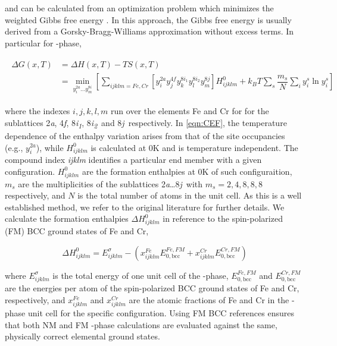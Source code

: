 \documentclass[superscriptaddress, 12pt]{revtex4-2}%
\newcommand{\ijklm}{ijklm}
\newcommand{\siteA}{2\textit{a}}
\newcommand{\siteB}{4\textit{f}}
\newcommand{\siteC}{8\textit{i\textsubscript{1}}}
\newcommand{\siteD}{8\textit{i\textsubscript{2}}}
\newcommand{\siteE}{8\textit{j}}
\begin{document}
\noindent and can be calculated from an optimization problem which minimizes the weighted Gibbs free energy \cite{zhang_prediction_2025}. 
In this approach, the Gibbs free energy is usually derived from a Gorsky-Bragg-Williams approximation without excess terms\cite{gorsky_rontgenographische_1928,bragg_effect_1997,chizhikov_gorsky-bragg-williams_2000}.
In particular for \textsigma-phase,

\begin{align}\label{eqn:CEF}
  \begin{split}
    \Delta G(x, T) &= \Delta H(x, T) - T S(x, T) \\
		   &= \min _{ y_i ^{2a}  \dots y_m ^{8i} } 
		   \left[  
		     \sum_{i j k l m = Fe, Cr} {}
		   \left[  
                    y_i^{2a} y_j^{4f} y_k^{8i_1} y_l ^{8i_2} y_m ^{8j}
                   \right] H_{i j k l m} ^0 
		   + k_B T \sum_s \dfrac{m_s}{N} \sum_i y_i ^s \ln y_i ^s
	           \right]
  \end{split}
\end{align}

\noindent where the indexes $i, j, k, l, m$ run over the elements Fe and Cr for for the sublattices \siteA, \siteB,  \siteC, \siteD~and \siteE~respectively.
In \autoref{eqn:CEF}, the temperature dependence of the enthalpy variation arises from that of the site occupancies (e.g., $y_i ^{2a}$), while $H^0_{ijklm}$ is calculated at 0K and is temperature independent.
The compound index \textit{\ijklm} identifies a particular end member with a given configuration. 
$H_{i j k l m} ^0$ are the formation enthalpies at 0K of such configuraition, $m_s$ are the multiplicities of the sublattices \siteA \ldots \siteE~with $m_s = 2, 4, 8, 8, 8$ respectively, and $N$ is the total number of atoms in the unit cell.
As this is a well established method, we refer to the original literature for further details.
We calculate the formation enthalpies $\Delta H_{ijklm}^0$ in reference to the spin-polarized (FM) BCC ground states of Fe and Cr, 

\begin{equation}\label{eqn:formation_enthalpy}
  \Delta H_{\ijklm}^0 = E_{\ijklm}^{\sigma} - \left( x_{\ijklm}^{Fe} E^{Fe,FM}_{0,\text{bcc}} + x_{\ijklm}^{Cr} E^{Cr,FM}_{0,\text{bcc}} \right)
\end{equation}

\noindent where $E_{\ijklm}^{\sigma}$ is the total energy of one unit cell of the \textsigma-phase, $E_{0,\text{bcc}}^{Fe,FM}$ and $E_{0,\text{bcc}}^{Cr,FM}$ are the energies per atom of the spin-polarized BCC ground states of Fe and Cr, respectively, and $x_{\ijklm}^{Fe}$ and $x_{ijklm}^{Cr}$ are the atomic fractions of Fe and Cr in the \textsigma-phase unit cell for the specific configuration.
Using FM BCC references ensures that both NM and FM \textsigma-phase calculations are evaluated against the same, physically correct elemental ground states.
\end{document}

